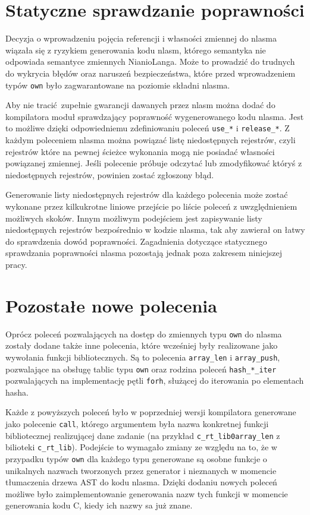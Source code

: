 \documentclass[licencjacka]{pracamgr}
\begin{document}
\section{Statyczne sprawdzanie poprawności}
Decyzja o wprowadzeniu pojęcia referencji i własności zmiennej do nlasma wiązała się z ryzykiem generowania
kodu nlasm, którego semantyka nie odpowiada semantyce zmiennych NianioLanga.
Może to prowadzić do trudnych do wykrycia błędów oraz naruszeń bezpieczeństwa, które przed wprowadzeniem
typów \texttt{own} było zagwarantowane na poziomie składni nlasma.

Aby nie tracić zupełnie gwarancji dawanych przez nlasm można dodać do kompilatora moduł
sprawdzający poprawność wygenerowanego kodu nlasma. Jest to możliwe dzięki odpowiedniemu zdefiniowaniu poleceń
\texttt{use\_*} i \texttt{release\_*}. Z każdym poleceniem nlasma można powiązać listę niedostępnych
rejestrów, czyli rejestrów które na pewnej ścieżce wykonania mogą nie posiadać własności powiązanej zmiennej.
Jeśli polecenie próbuje odczytać lub zmodyfikować któryś z niedostępnych rejestrów, powinien zostać zgłoszony
błąd.

Generowanie listy niedostępnych rejestrów dla każdego polecenia może zostać wykonane przez kilkukrotne
liniowe przejście po liście poleceń z uwzględnieniem możliwych skoków.
Innym możliwym podejściem jest zapisywanie listy niedostępnych rejestrów bezpośrednio
w kodzie nlasma, tak aby zawierał on łatwy do sprawdzenia dowód poprawności.
Zagadnienia dotyczące statycznego sprawdzania poprawności nlasma pozostają jednak poza zakresem niniejszej
pracy.

\section{Pozostałe nowe polecenia}
Oprócz poleceń pozwalających na dostęp do zmiennych typu \texttt{own} do nlasma zostały dodane także inne 
polecenia, które wcześniej były realizowane jako wywołania funkcji bibliotecznych.
Są to polecenia \texttt{array\_len} i \texttt{array\_push}, pozwalające na obsługę tablic typu \texttt{own}
oraz rodzina poleceń \texttt{hash\_*\_iter} pozwalających na implementację pętli \texttt{forh},
służącej do iterowania po elementach hasha.

Każde z powyższych poleceń było w poprzedniej wersji kompilatora generowane jako polecenie \texttt{call},
którego argumentem była nazwa konkretnej funkcji bibliotecznej realizującej dane zadanie (na przykład
\texttt{c\_rt\_lib0array\_len} z bilioteki \texttt{c\_rt\_lib}). Podejście to wymagało zmiany ze względu
na to, że w przypadku typów \texttt{own} dla każdego typu generowane są osobne funkcje o unikalnych
nazwach tworzonych przez generator i nieznanych w momencie tłumaczenia drzewa AST do kodu nlasma.
Dzięki dodaniu nowych poleceń możliwe było zaimplementowanie generowania nazw tych funkcji w momencie
generowania kodu C, kiedy ich nazwy sa już znane.
\end{document}
